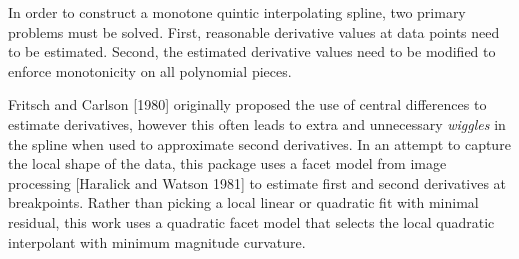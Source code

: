 

In order to construct a monotone quintic interpolating spline, two
primary problems must be solved. First, reasonable derivative values
at data points need to be estimated. Second, the estimated derivative
values need to be modified to enforce monotonicity on all polynomial
pieces.


Fritsch and Carlson [1980] originally proposed the use of central differences
to estimate derivatives, however this often leads to extra and unnecessary
{\it wiggles} in the spline when used to approximate second derivatives.
In an attempt to capture the local shape of the data, this package uses a
facet model from image processing [Haralick and Watson 1981] to estimate
first and second derivatives at breakpoints. Rather than picking a local
linear or quadratic fit with minimal residual, this work uses a quadratic
facet model that selects the local quadratic interpolant with minimum
magnitude curvature.

